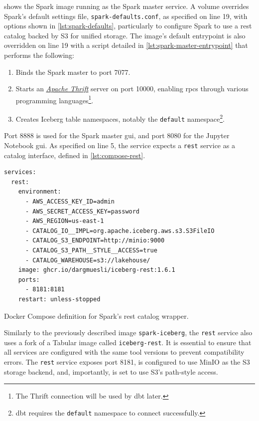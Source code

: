  shows the Spark image running as the Spark master service.
A volume overrides Spark's default settings file, \texttt{spark-defaults.conf}, as specified on line 19, with options shown in \cref{lst:spark-defaults}, particularly to configure Spark to use a \ac{rest} catalog backed by S3 for unified storage.
The image's default entrypoint is also overridden on line 19 with a script detailed in \cref{lst:spark-master-entrypoint} that performs the following:

\begin{enumerate}
    \item Binds the Spark master to port 7077.
    \item Starts an \href{https://thrift.apache.org/}{\textit{Apache Thrift}} server on port 10000, enabling \acp{rpc} through various programming languages\footnote{The Thrift connection will be used by dbt later.}.
    \item Creates Iceberg table namespaces, notably the \texttt{default} namespace\footnote{dbt requires the \texttt{default} namespace to connect successfully.}.
\end{enumerate}

Port 8888 is used for the Spark master \ac{gui}, and port 8080 for the Jupyter Notebook \ac{gui}.
As specified on line 5, the service expects a \texttt{rest} service as a catalog interface, defined in \cref{lst:compose-rest}.

\begin{listing}[H]
\begin{verbatim}
services:
  rest:
    environment:
      - AWS_ACCESS_KEY_ID=admin
      - AWS_SECRET_ACCESS_KEY=password
      - AWS_REGION=us-east-1
      - CATALOG_IO__IMPL=org.apache.iceberg.aws.s3.S3FileIO
      - CATALOG_S3_ENDPOINT=http://minio:9000
      - CATALOG_S3_PATH__STYLE__ACCESS=true
      - CATALOG_WAREHOUSE=s3://lakehouse/
    image: ghcr.io/dargmuesli/iceberg-rest:1.6.1
    ports:
      - 8181:8181
    restart: unless-stopped
\end{verbatim}
\caption{Docker Compose definition for Spark's \ac{rest} catalog wrapper.}
\label{lst:compose-rest}
\end{listing}

Similarly to the previously described image \texttt{spark-iceberg}, the \texttt{rest} service also uses a fork of a Tabular image called \texttt{iceberg-rest}.
It is essential to ensure that all services are configured with the same tool versions to prevent compatibility errors.
The \texttt{rest} service exposes port 8181, is configured to use MinIO as the S3 storage backend, and, importantly, is set to use S3's path-style access.

